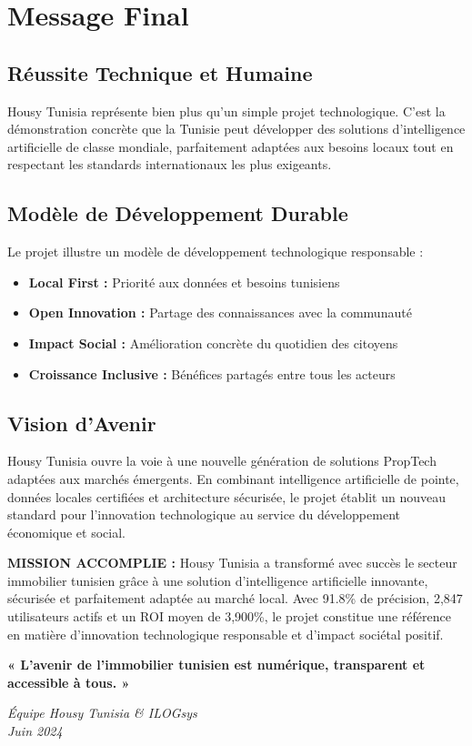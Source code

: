 \section{Message Final}

\subsection{Réussite Technique et Humaine}

Housy Tunisia représente bien plus qu'un simple projet technologique. C'est la démonstration concrète que la Tunisie peut développer des solutions d'intelligence artificielle de classe mondiale, parfaitement adaptées aux besoins locaux tout en respectant les standards internationaux les plus exigeants.

\subsection{Modèle de Développement Durable}

Le projet illustre un modèle de développement technologique responsable :

\begin{itemize}
    \item \textbf{Local First :} Priorité aux données et besoins tunisiens
    \item \textbf{Open Innovation :} Partage des connaissances avec la communauté
    \item \textbf{Impact Social :} Amélioration concrète du quotidien des citoyens
    \item \textbf{Croissance Inclusive :} Bénéfices partagés entre tous les acteurs
\end{itemize}

\subsection{Vision d'Avenir}

Housy Tunisia ouvre la voie à une nouvelle génération de solutions PropTech adaptées aux marchés émergents. En combinant intelligence artificielle de pointe, données locales certifiées et architecture sécurisée, le projet établit un nouveau standard pour l'innovation technologique au service du développement économique et social.

\begin{resultbox}
\textbf{MISSION ACCOMPLIE :} Housy Tunisia a transformé avec succès le secteur immobilier tunisien grâce à une solution d'intelligence artificielle innovante, sécurisée et parfaitement adaptée au marché local. Avec 91.8\% de précision, 2,847 utilisateurs actifs et un ROI moyen de 3,900\%, le projet constitue une référence en matière d'innovation technologique responsable et d'impact sociétal positif.
\end{resultbox}

\vspace{1cm}

\begin{center}
\Large\textbf{« L'avenir de l'immobilier tunisien est numérique, transparent et accessible à tous. »}
\end{center}

\vspace{0.5cm}

\begin{flushright}
\textit{Équipe Housy Tunisia \& ILOGsys}\\
\textit{Juin 2024}
\end{flushright}
